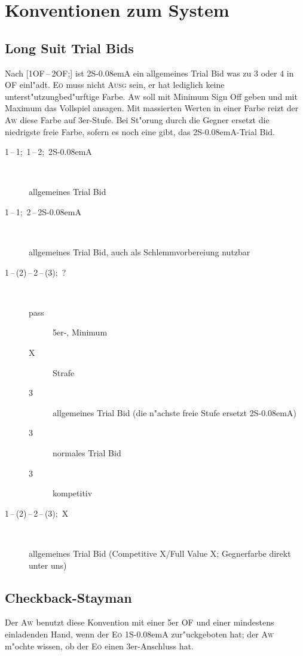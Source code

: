 \documentclass[11pt,german,twocolumn]{scrartcl}
\def\pik{\nobreak\hspace{\cardskip}\Sp\xspace}
\def\coe{\nobreak\hspace{\cardskip}\He\xspace}
\def\kar{\nobreak\hspace{\cardskip}\Di\xspace}
\def\tre{\nobreak\hspace{\cardskip}\Cl\xspace}
\def\pi{\Sp\xspace}
\def\of{\nobreak\hspace{\cardskip}\textsf{OF}\xspace}
\def\ofa{\nobreak\textsf{OF}\xspace}
\def\sa{\nobreak\textsf{S\kern-0.08emA}\xspace}
\def\SA{\nobreak\hspace{\cardskip}\sa}
\def\kontra{\textsf{X}\xspace}
\def\sep{\,--\,}
\def\bal{\textsc{Ausg}\xspace}
\def\aw{\textsc{Aw}\xspace}
\def\eo{\textsc{E\"o}\xspace}
\begin{document}
\newpage
\section{Konventionen zum System}

\subsection{Long Suit Trial Bids}

Nach [1\of{}\sep2\of;] ist 2\SA ein allgemeines Trial Bid was zu 3 oder 4 in
\ofa einl"adt. \eo muss nicht \bal sein, er hat lediglich keine
unterst"utzungbed"urftige Farbe. \aw soll mit Minimum Sign Off geben und mit
Maximum das Vollspiel ansagen. Mit massierten Werten in einer Farbe reizt der
\aw diese Farbe auf 3er-Stufe. Bei St"orung durch die Gegner ersetzt die
niedrigste freie Farbe, sofern es noch eine gibt, das 2\SA-Trial Bid.

\begin{description}
\item[1\tre{}\sep1\coe;~1\pik{}\sep2\pik;~2\SA]~

  allgemeines Trial Bid
\item[1\tre{}\sep1\pik;~2\pik{}\sep2\SA]~

  allgemeines Trial Bid, auch als Schlemmvorbereiung nutzbar
\item[1\pik{}\sep(2\tre)\sep2\pik{}\sep(3\tre);~?]~
  \begin{description}
    \item[pass] 5er-\pi, Minimum
    \item[\kontra] Strafe
    \item[3\kar] allgemeines Trial Bid (die n"achste freie Stufe
      ersetzt 2\SA)
    \item[3\coe] normales Trial Bid
    \item[3\pik] kompetitiv
  \end{description}
\item[1\pik{}\sep(2\coe)\sep2\pik{}\sep(3\coe);~\kontra]~

  allgemeines Trial Bid (Competitive \kontra/Full Value \kontra;
  Gegnerfarbe direkt unter uns)
\end{description}

\subsection{Checkback-Stayman}

Der \aw benutzt diese Konvention mit einer 5er \ofa und einer mindestens
einladenden Hand, wenn der \eo 1\SA zur"uckgeboten hat; der \aw m"ochte
wissen, ob der \eo einen 3er-Anschluss hat.
\end{document}
